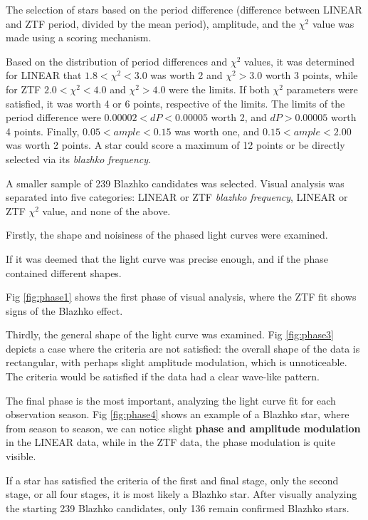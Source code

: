 The selection of stars based on the period difference (difference between LINEAR and ZTF period, divided by the mean period), amplitude, and the $\chi^2$ value was made using a scoring mechanism.

Based on the distribution of period differences and $\chi^2$ values, it was determined for LINEAR that $1.8<\chi^2<3.0$ was worth 2 and $\chi^2>3.0$ worth 3 points, while for ZTF $2.0<\chi^2<4.0$ and $\chi^2>4.0$ were the limits. If both $\chi^2$ parameters were satisfied, it was worth 4 or 6 points, respective of the limits. 
The limits of the period difference were $0.00002 < dP < 0.00005$ worth 2, and $dP > 0.00005$ worth 4 points. Finally, $0.05 < ample < 0.15$ was worth one, and $0.15 < ample < 2.00$ was worth 2 points. 
A star could score a maximum of 12 points or be directly selected via its \textit{blazhko frequency}.

A smaller sample of 239 Blazhko candidates was selected. Visual analysis was separated into five categories: LINEAR or ZTF \textit{blazhko frequency}, LINEAR or ZTF $\chi^2$ value, and none of the above. 

Firstly, the shape and noisiness of the phased light curves were examined. 

If it was deemed that the light curve was precise enough, and if the phase contained different shapes. 

Fig \ref{fig:phase1} shows the first phase of visual analysis, where the ZTF fit shows signs of the Blazhko effect.


Thirdly, the general shape of the light curve was examined. Fig \ref{fig:phase3} depicts a case where the criteria are not satisfied: the overall shape of the data is rectangular, with perhaps slight amplitude modulation, which is unnoticeable. The criteria would be satisfied if the data had a clear wave-like pattern.
    
The final phase is the most important, analyzing the light curve fit for each observation season. Fig \ref{fig:phase4} shows an example of a Blazhko star, where from season to season, we can notice slight \textbf{phase and amplitude modulation} in the LINEAR data, while in the ZTF data, the phase modulation is quite visible. 


If a star has satisfied the criteria of the first and final stage, only the second stage, or all four stages, it is most likely a Blazhko star. After visually analyzing the starting 239 Blazhko candidates, only 136 remain confirmed Blazhko stars.
